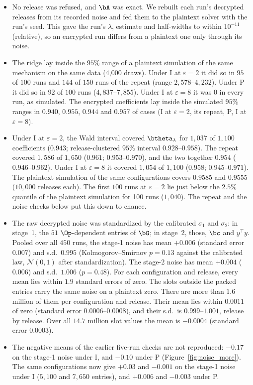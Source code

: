 \begin{itemize}[noitemsep]
  \item No release was refused, and $\bA$ was exact. We rebuilt each run's decrypted releases from its recorded noise and fed them to the plaintext solver with the run's seed. This gave the run's $\lambda$, estimate and half-widths to within $10^{-11}$ (relative), so an encrypted run differs from a plaintext one only through its noise.
  \item The ridge lay inside the $95\%$ range of a plaintext simulation of the same mechanism on the same data (4{,}000 draws). Under I at $\varepsilon = 2$ it did so in $95$ of $100$ runs and $144$ of $150$ runs of the repeat (range $2{,}578$--$4{,}232$). Under P it did so in $92$ of $100$ runs ($4{,}837$--$7{,}855$). Under I at $\varepsilon = 8$ it was $0$ in every run, as simulated. The encrypted coefficients lay inside the simulated $95\%$ ranges in $0.940$, $0.955$, $0.944$ and $0.957$ of cases (I at $\varepsilon = 2$, its repeat, P, I at $\varepsilon = 8$).
  \item Under I at $\varepsilon = 2$, the Wald interval covered $\btheta_\lambda$ for $1{,}037$ of $1{,}100$ coefficients ($0.943$; release-clustered $95\%$ interval $0.928$--$0.958$). The repeat covered $1{,}586$ of $1{,}650$ ($0.961$; $0.953$--$0.970$), and the two together $0.954$ ($0.946$--$0.962$). Under I at $\varepsilon = 8$ it covered $1{,}054$ of $1{,}100$ ($0.958$; $0.945$--$0.971$). The plaintext simulation of the same configurations covers $0.9585$ and $0.9555$ ($10{,}000$ releases each). The first $100$ runs at $\varepsilon = 2$ lie just below the $2.5\%$ quantile of the plaintext simulation for 100 runs ($1{,}040$). The repeat and the noise checks below put this down to chance.
  \item The raw decrypted noise was standardized by the calibrated $\sigma_1$ and $\sigma_2$: in stage~1, the $51$ $\Op$-dependent entries of $\bG$; in stage~2, those, $\bc$ and $y^\top y$. Pooled over all $450$ runs, the stage-1 noise has mean $+0.006$ (standard error $0.007$) and s.d.\ $0.995$ (Kolmogorov--Smirnov $p = 0.13$ against the calibrated law, $\mathcal N(0, 1)$ after standardization). The stage-2 noise has mean $+0.004$ ($0.006$) and s.d.\ $1.006$ ($p = 0.48$). For each configuration and release, every mean lies within $1.9$ standard errors of zero. The slots outside the packed entries carry the same noise on a plaintext zero. There are more than $1.6$ million of them per configuration and release. Their mean lies within $0.0011$ of zero (standard error $0.0006$--$0.0008$), and their s.d.\ is $0.999$--$1.001$, release by release. Over all $14.7$ million slot values the mean is $-0.0004$ (standard error $0.0003$).
  \item The negative means of the earlier five-run checks are not reproduced: $-0.17$ on the stage-1 noise under I, and $-0.10$ under P (Figure~\ref{fig:noise_more}). The same configurations now give $+0.03$ and $-0.001$ on the stage-1 noise under I ($5{,}100$ and $7{,}650$ entries), and $+0.006$ and $-0.003$ under P.
\end{itemize}

